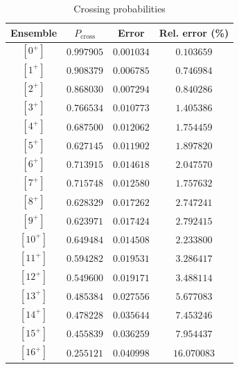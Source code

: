 \documentclass[a4paper]{article}
\begin{document}
\begin{longtable}{| c | c | c | c |}
\caption{Crossing probabilities}\\
\hline
Ensemble & $P_\text{cross}$ & Error & Rel. error (\%)\\ \hline
$ [0^+]  $ & $ 0.997905 $ & $ 0.001034 $ & $ 0.103659 $\\
$ [1^+]  $ & $ 0.908379 $ & $ 0.006785 $ & $ 0.746984 $\\
$ [2^+]  $ & $ 0.868030 $ & $ 0.007294 $ & $ 0.840286 $\\
$ [3^+]  $ & $ 0.766534 $ & $ 0.010773 $ & $ 1.405386 $\\
$ [4^+]  $ & $ 0.687500 $ & $ 0.012062 $ & $ 1.754459 $\\
$ [5^+]  $ & $ 0.627145 $ & $ 0.011902 $ & $ 1.897820 $\\
$ [6^+]  $ & $ 0.713915 $ & $ 0.014618 $ & $ 2.047570 $\\
$ [7^+]  $ & $ 0.715748 $ & $ 0.012580 $ & $ 1.757632 $\\
$ [8^+]  $ & $ 0.628329 $ & $ 0.017262 $ & $ 2.747241 $\\
$ [9^+]  $ & $ 0.623971 $ & $ 0.017424 $ & $ 2.792415 $\\
$ [10^+] $ & $ 0.649484 $ & $ 0.014508 $ & $ 2.233800 $\\
$ [11^+] $ & $ 0.594282 $ & $ 0.019531 $ & $ 3.286417 $\\
$ [12^+] $ & $ 0.549600 $ & $ 0.019171 $ & $ 3.488114 $\\
$ [13^+] $ & $ 0.485384 $ & $ 0.027556 $ & $ 5.677083 $\\
$ [14^+] $ & $ 0.478228 $ & $ 0.035644 $ & $ 7.453246 $\\
$ [15^+] $ & $ 0.455839 $ & $ 0.036259 $ & $ 7.954437 $\\
$ [16^+] $ & $ 0.255121 $ & $ 0.040998 $ & $16.070083 $\\
\hline
\end{longtable}
\end{document}
